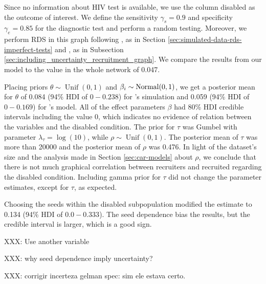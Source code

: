 Since no information about HIV test is available, we use the
column disabled as the outcome of interest. We define the sensitivity
$\gamma_s = 0.9$ and specificity $\gamma_e = 0.85$ for the diagnostic test and
perform a random testing. Moreover, we perform
RDS in this graph following \textcite{baraff2016estimating}, as in Section
\ref{sec:simulated-data-rds-imperfect-tests} and \textcite{crawford2016}, as
in Subsection \ref{sec:including_uncertainty_recruitment_graph}. We compare
the results from our model to the value in the whole network of 0.047. 

Placing priors $\theta \sim \operatorname{Unif}(0,1)$ and $\beta_i \sim
\operatorname{Normal}(0,1)$, we get a posterior mean for $\theta$ of 0.084 (94\% HDI of $0 -
0.238$) for \textcite{baraff2016estimating}'s simulation and 
0.059 (94\% HDI of $0 - 0.169$) for \textcite{crawford2016}'s model.
All of the effect parameters $\beta$ had 80\% HDI credible intervals
including the value $0$, which indicates no evidence of relation between the variables and
the disabled condition. The prior for $\tau$ was Gumbel with parameter
$\lambda_{\tau} = \log(10)$, while $\rho \sim \operatorname{Unif}(0,1)$. The
posterior mean of $\tau$ was more than 20000 and the posterior mean of $\rho$
was 0.476. In light of the dataset's size and the analysis made in Section
\ref{sec:car-models} about $\rho$, we conclude that there is not much graphical correlation
between recruiters and recruited regarding the disabled condition. Including
gamma prior for $\tau$ did not change the parameter estimates, except for
$\tau$, as expected.

Choosing the seeds within the disabled subpopulation modified the estimate to
0.134 (94\% HDI of $0.0 - 0.333$). The seed dependence bias the results, but
the credible interval is larger, which is a good sign. 

XXX: Use another variable

XXX: why seed dependence imply uncertainty?

XXX: corrigir incerteza gelman spec: sim ele estava certo.